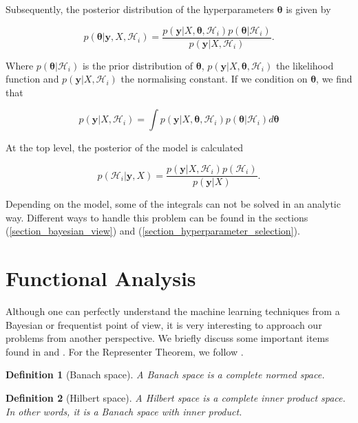 \documentclass[12pt,a4paper,oneside]{book}
\newtheorem{Definition}{Definition}
\begin{document}
Subsequently, the posterior distribution of the hyperparameters
$\bm{\theta}$ is given by

\begin{equation}\label{Bayesian_analysis3}
p(\bm{\theta}|\bm{y},X,\mathcal{H}_i) = \dfrac{p(\bm{y}|X,\bm{\theta},\mathcal{H}_i)p(\bm{\theta}|\mathcal{H}_i)}{p(\bm{y}|X,\mathcal{H}_i)}.
\end{equation}

Where $p(\bm{\theta}|\mathcal{H}_i)$ is the prior distribution of $\bm{\theta}$, $p(\bm{y}|X,\bm{\theta},\mathcal{H}_i)$ the likelihood function and $p(\bm{y}|X,\mathcal{H}_i)$ the normalising constant. If we condition on $\bm{\theta}$, we find that 

\begin{equation}\label{Bayesian_analysis4}
p(\bm{y}|X,\mathcal{H}_i) = \int p(\bm{y}|X,\bm{\theta},\mathcal{H}_i)p(\bm{\theta}|\mathcal{H}_i)d\bm{\theta}
\end{equation}

At the top level, the posterior of the model is calculated

\begin{equation}\label{Bayesian_analysis5}
p(\mathcal{H}_i|\bm{y},X) = \dfrac{p(\bm{y}|X,\mathcal{H}_i)p(\mathcal{H}_i)}{p(\bm{y}|X)}.
\end{equation}

Depending on the model, some of the integrals can not be solved in an analytic way. Different ways to handle this problem can be found in the sections (\ref{section_bayesian_view}) and (\ref{section_hyperparameter_selection}). 
 

\section{Functional Analysis}\label{Functional_Analysis}

Although one can perfectly understand the machine learning techniques from a Bayesian or frequentist point of view, it is very interesting to approach our problems from another perspective. We briefly discuss some important items found in \cite{GPRbook} and \cite{sejdinovic2012rkhs}. For the Representer Theorem, we follow \cite{scholkopf2001generalized}.

\begin{Definition}[Banach space]
A Banach space is a complete normed space.
\end{Definition}

\begin{Definition}[Hilbert space]
A Hilbert space is a complete inner product space. In other words, it is a Banach space with inner product.
\end{Definition}
\end{document}
